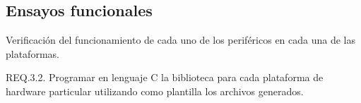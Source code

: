 \subsection{Ensayos funcionales}

Verificación del funcionamiento de cada uno de los periféricos en cada una de las plataformas.


REQ.3.2. Programar en lenguaje C la biblioteca para cada plataforma de hardware particular utilizando como plantilla los archivos generados.

